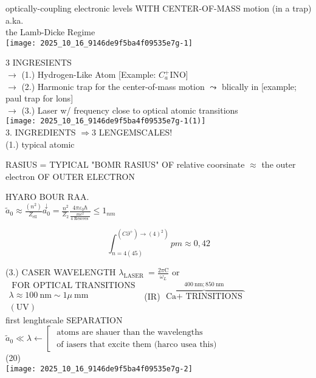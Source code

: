 
\captionsetup{singlelinecheck=false}
optically-coupling electronic levels WITH CENTER-OF-MASS motion (in a trap) a.ka.\\
the Lamb-Dicke Regime\\
\texttt{[image: 2025\_10\_16\_9146de9f5ba4f09535e7g-1]}

3 INGRESIENTS\\
$\rightarrow$ (1.) Hydrogen-Like Atom [Example: $C_{a}^{+}$INO]\\
$\rightarrow$ (2.) Harmonic trap for the center-of-mass motion $\leadsto$ blically in [example; paul trap for lons]\\
$\rightarrow$ (3.) Laser w/ frequency close to optical atomic transitions\\
\texttt{[image: 2025\_10\_16\_9146de9f5ba4f09535e7g-1(1)]}\\
3. INGREDIENTS $\Rightarrow 3$ LENGEMSCALES!\\
(1.) typical atomic

RASIUS = TYPICAL "BOMR RASIUS" OF relative coorsinate $\approx$ the outer electron OF OUTER ELECTRON

HYARO BOUR RAA.\\
$\tilde{a}_{0} \approx \frac{\left(n^{2}\right)}{Z_{\text {ell }}} \stackrel{\downarrow}{a_{0}}=\frac{n^{2}}{Z_{2}} \frac{4 \pi \varepsilon_{0} \hbar}{\frac{m e^{2}}{4 \text { Rescees }}} \leqslant 1_{n m}$

$$
\int_{n=4(45)}^{\left.\left(C \partial^{+}\right) \rightarrow(4)^{2}\right)} p m \approx 0,42
$$

(3.) CASER WAVELENGTH $\lambda_{\text {LASER }}=\frac{2 \pi \mathrm{C}}{\omega_{L}}$ or $\begin{gathered}\text { FOR OPTICAL TRANSITIONS } \\ \lambda \approx 100 \mathrm{~nm} \sim 1 \mu \mathrm{~mm} \\ (\mathrm{UV})\end{gathered}$ (IR) $\overbrace{\text { Ca+ TRINSITIONS }}^{400 \mathrm{~nm} ; 850 \mathrm{~nm}}$\\
first lenghtscale SEPARATION\\
$\tilde{a}_{0} \ll \lambda \leftarrow\left[\begin{array}{l}\text { atoms are shauer than the wavelengths } \\ \text { of iasers that excite them (harco usea this) }\end{array}\right.$\\
(20)\\
\texttt{[image: 2025\_10\_16\_9146de9f5ba4f09535e7g-2]}

